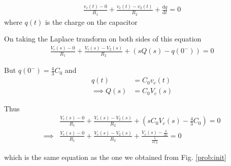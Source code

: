 \documentclass[journal,12pt,twocolumn]{IEEEtran}
\providecommand{\brak}[1]{\ensuremath{\left(#1\right)}}
\providecommand{\der}[1]{\mathrm{d} #1}
\numberwithin{equation}{section}
\numberwithin{figure}{section}
\renewcommand\thesection{\arabic{section}}
\begin{document}
\begin{enumerate}[label=\thesection.\arabic*,ref=\thesection.\theenumi]
				\begin{align}
					\frac{v_c(t) - 0}{R_1} + \frac{v_c(t) - v_2(t)}{R_2} + \frac{\der{q}}{\der{t}} = 0
				\end{align}
				where $q(t)$ is the charge on the capacitor
	
				On taking the Laplace transform on both sides of this equation
				\begin{align}
					\frac{V_c(s) - 0}{R_1} + \frac{V_c(s) - V_2(s)}{R_2} + \brak{sQ(s) - q(0^-)} = 0
				\end{align}
	
				But $q(0^-) = \frac43 C_0$ and 
				\begin{align}
					q(t) &= C_0v_c(t) \\
					\implies Q(s) &= C_0V_c(s)
				\end{align}
				
				Thus
				\begin{align}
					&\frac{V_c(s) - 0}{R_1} + \frac{V_c(s) - V_2(s)}{R_2} + \brak{sC_0V_c(s) - \frac43 C_0} = 0 \\
					\implies &\frac{V_c(s) - 0}{R_1} + 	\frac{V_c(s) - V_2(s)}{R_2} + \frac{V_c(s) - \frac{4}{3s}}{\frac{1}{sC_0}} = 0 
				\end{align}
	
				which is the same equation as the one we obtained from Fig. \ref{prob:init}\\

	\end{enumerate}
	\pagebreak
\end{document}
